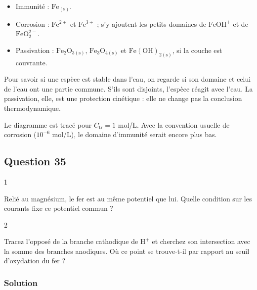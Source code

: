 \documentclass[11pt,a4paper]{article}
\providecommand{\tightlist}{\setlength{\itemsep}{0pt}\setlength{\parskip}{0pt}}
\begin{document}
\begin{itemize}
\tightlist
\item
  Immunité : \(\mathrm{Fe_{(s)}}\).
\item
  Corrosion : \(\mathrm{Fe^{2+}}\) et \(\mathrm{Fe^{3+}}\) ; s'y ajoutent les petits domaines de \(\mathrm{FeOH^+}\) et de \(\mathrm{FeO_2^{2-}}\).
\item
  Passivation : \(\mathrm{Fe_2O_{3(s)}}\), \(\mathrm{Fe_3O_{4(s)}}\) et \(\mathrm{Fe(OH)_{2(s)}}\), si la couche est couvrante.
\end{itemize}

\begin{methode}

Pour savoir si une espèce est stable dans l'eau, on regarde si son domaine et celui de l'eau ont une partie commune. S'ils sont disjoints, l'espèce réagit avec l'eau. La passivation, elle, est une protection cinétique : elle ne change pas la conclusion thermodynamique.

\end{methode}

\begin{piege}

Le diagramme est tracé pour \(C_{\text{tr}}=1\) mol/L. Avec la convention usuelle de corrosion (\(10^{-6}\) mol/L), le domaine d'immunité serait encore plus bas.

\end{piege}

\hypertarget{question-35}{%
\subsection{Question 35}\label{question-35}}

\begin{indication}{1}

Relié au magnésium, le fer est au même potentiel que lui. Quelle condition sur les courants fixe ce potentiel commun ?

\end{indication}

\begin{indication}{2}

Tracez l'opposé de la branche cathodique de \(\mathrm{H^+}\) et cherchez son intersection avec la somme des branches anodiques. Où ce point se trouve-t-il par rapport au seuil d'oxydation du fer ?

\end{indication}

\hypertarget{solution-34}{%
\subsubsection{Solution}\label{solution-34}}
\end{document}
